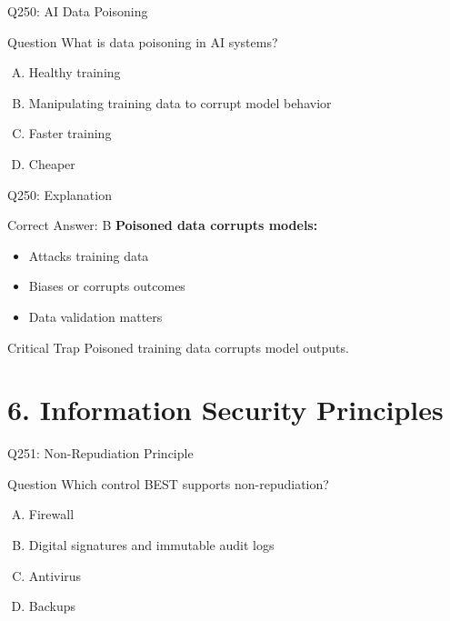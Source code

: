 \documentclass{beamer}
\begin{document}
	\begin{frame}{Q250: AI Data Poisoning}
		\begin{block}{Question}
			What is data poisoning in AI systems?
		\end{block}
		\begin{enumerate}[(A)]
			\item Healthy training
			\item Manipulating training data to corrupt model behavior
			\item Faster training
			\item Cheaper
		\end{enumerate}
	\end{frame}
	
	\begin{frame}{Q250: Explanation}
		\begin{block}{Correct Answer: B}
			\textbf{Poisoned data corrupts models:}
			\begin{itemize}
				\item Attacks training data
				\item Biases or corrupts outcomes
				\item Data validation matters
			\end{itemize}
		\end{block}
		\begin{alertblock}{Critical Trap}
			Poisoned training data corrupts model outputs.
		\end{alertblock}
	\end{frame}
	
	\section{6. Information Security Principles}
	
	\begin{frame}{Q251: Non-Repudiation Principle}
		\begin{block}{Question}
			Which control BEST supports non-repudiation?
		\end{block}
		\begin{enumerate}[(A)]
			\item Firewall
			\item Digital signatures and immutable audit logs
			\item Antivirus
			\item Backups
		\end{enumerate}
	\end{frame}
	
\end{document}
